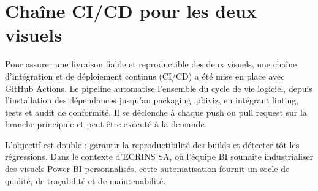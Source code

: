 
\section{Chaîne CI/CD pour les deux visuels}
\label{sec:ci-cd}

Pour assurer une livraison fiable et reproductible des deux visuels, une chaîne d’intégration et de déploiement continus (CI/CD) a été mise en place avec GitHub Actions. Le pipeline automatise l’ensemble du cycle de vie logiciel, depuis l’installation des dépendances jusqu’au packaging .pbiviz, en intégrant linting, tests et audit de conformité. Il se déclenche à chaque push ou pull request sur la branche principale et peut être exécuté à la demande.

L’objectif est double : garantir la reproductibilité des builds et détecter tôt les régressions. Dans le contexte d’ECRINS SA, où l’équipe BI souhaite industrialiser des visuels Power BI personnalisés, cette automatisation fournit un socle de qualité, de traçabilité et de maintenabilité.


